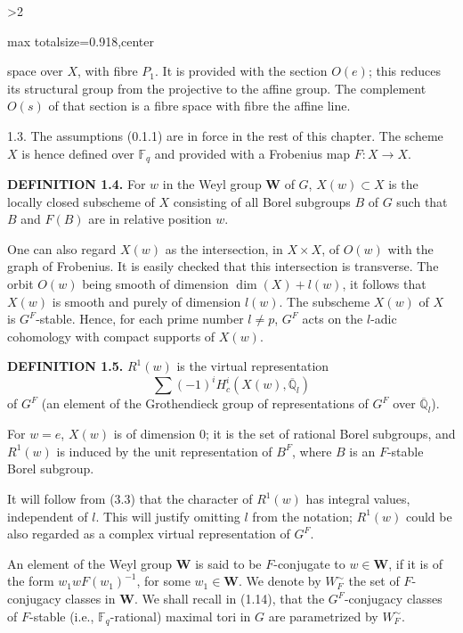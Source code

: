 \documentclass[9pt,twoside]{extarticle}
\newcommand{\EditionPage}[3]{%
  \ifnum#1>2\clearpage\fi
  \pdfbookmark[1]{Printed page #2}{en-folio-#2}%
  \hypertarget{en-physical-#1}{}%
  \noindent\begin{adjustbox}{max totalsize={\textwidth}{0.918\textheight},center}
  \begin{minipage}[t]{\textwidth}
  \fontsize{9.4}{11.1}\selectfont\justifying
  #3
  \end{minipage}
  \end{adjustbox}%
}
\begin{document}
\EditionPage{6}{107}{%
space over \(X\), with fibre \(P_1\). It is provided with the section \(O(e)\); this reduces its structural group from the projective to the affine group. The complement \(O(s)\) of that section is a fibre space with fibre the affine line.\par

1.3. The assumptions (0.1.1) are in force in the rest of this chapter. The scheme \(X\) is hence defined over \(\mathbb{F}_q\) and provided with a Frobenius map \(F:X\to X\).\par

\noindent\textbf{DEFINITION 1.4.} For \(w\) in the Weyl group \(\mathbf{W}\) of \(G\), \(X(w)\subset X\) is the locally closed subscheme of \(X\) consisting of all Borel subgroups \(B\) of \(G\) such that \(B\) and \(F(B)\) are in relative position \(w\).\par

One can also regard \(X(w)\) as the intersection, in \(X\times X\), of \(O(w)\) with the graph of Frobenius. It is easily checked that this intersection is transverse. The orbit \(O(w)\) being smooth of dimension \(\dim(X)+l(w)\), it follows that \(X(w)\) is smooth and purely of dimension \(l(w)\). The subscheme \(X(w)\) of \(X\) is \(G^F\)-stable. Hence, for each prime number \(l\ne p\), \(G^F\) acts on the \(l\)-adic cohomology with compact supports of \(X(w)\).\par

\noindent\textbf{DEFINITION 1.5.} \(R^1(w)\) is the virtual representation \[
\sum(-1)^i H_c^i(X(w),\overline{\mathbb{Q}}_l)
\] of \(G^F\) (an element of the Grothendieck group of representations of \(G^F\) over \(\overline{\mathbb{Q}}_l\)).\par

For \(w=e\), \(X(w)\) is of dimension 0; it is the set of rational Borel subgroups, and \(R^1(w)\) is induced by the unit representation of \(B^F\), where \(B\) is an \(F\)-stable Borel subgroup.\par

It will follow from (3.3) that the character of \(R^1(w)\) has integral values, independent of \(l\). This will justify omitting \(l\) from the notation; \(R^1(w)\) could be also regarded as a complex virtual representation of \(G^F\).\par

An element of the Weyl group \(\mathbf{W}\) is said to be \(F\)-conjugate to \(w\in\mathbf{W}\), if it is of the form \(w_1wF(w_1)^{-1}\), for some \(w_1\in\mathbf{W}\). We denote by \(W_F^{\sim}\) the set of \(F\)-conjugacy classes in \(\mathbf{W}\). We shall recall in (1.14), that the \(G^F\)-conjugacy classes of \(F\)-stable (i.e., \(\mathbb{F}_q\)-rational) maximal tori in \(G\) are parametrized by \(W_F^{\sim}\).\par

}
\end{document}
